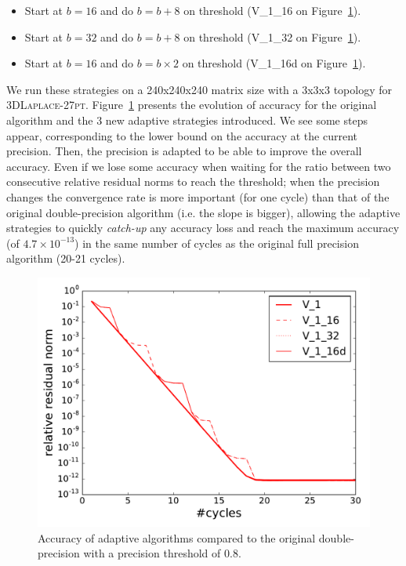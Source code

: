 \begin{itemize}

    \item Start at $b=16$ and do $b=b+8$ on threshold (V\_1\_16 on Figure~\ref{fig.prec_incr}).

    \item Start at $b=32$ and do $b=b+8$ on threshold (V\_1\_32 on Figure~\ref{fig.prec_incr}).

    \item Start at $b=16$ and do $b=b\times2$ on threshold (V\_1\_16d on Figure~\ref{fig.prec_incr}).

\end{itemize}

We run these strategies on a 240x240x240 matrix size with a 3x3x3 topology for
\textsc{3DLaplace-27pt}. Figure~\ref{fig.prec_incr} presents the evolution of
accuracy for the original algorithm and the 3 new adaptive strategies
introduced.  We see some steps appear, corresponding to the lower bound on the
accuracy at the current precision. Then, the precision is adapted to be able to
improve the overall accuracy. Even if we lose some accuracy when waiting for
the ratio between two consecutive relative residual norms to reach the
threshold; when the precision changes the convergence rate is more important
(for one cycle) than that of the original double-precision algorithm (i.e. the
slope is bigger), allowing the adaptive strategies to quickly \emph{catch-up}
any accuracy loss and reach the maximum accuracy (of $4.7\times 10^{-13}$) in
the same number of cycles as the original full precision algorithm (20-21
cycles).

\begin{figure}[htb]
    \centering
    \includegraphics[width=0.9\linewidth]{figs/prec_incr.pdf}
    \caption{Accuracy of adaptive algorithms compared to the original
    double-precision with a precision threshold of $0.8$.}
    \label{fig.prec_incr}
\end{figure}

